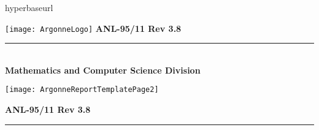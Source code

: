 %
%

hyperbaseurl

\makeindex

\def\design{\medskip \noindent Design Issue:\begin{em}}
\def\enddesign{\end{em} \medskip}


\def\shortintro{false}

\usepackage{fancyhdr,lastpage}
\pagestyle{fancy}





\pagestyle{empty}
\hspace{-.65in}\texttt{[image: ArgonneLogo]}
\hfill  {\large {\bf ANL-95/11 Rev 3.8}}

\vspace*{3in}
\vspace*{8pt}
\hrule
\vspace*{8pt}

\vspace*{1in}
\noindent \\
{\Large {\bf Mathematics and Computer Science Division}}

\vspace*{10pt}


\vspace*{20pt}



\newpage
\centerline{\texttt{[image: ArgonneReportTemplatePage2]}}
\newpage

\hfill {\large {\bf ANL-95/11 Rev 3.8}}

\vspace*{3in}
\vspace*{8pt}
\hrule
\vspace*{8pt}

